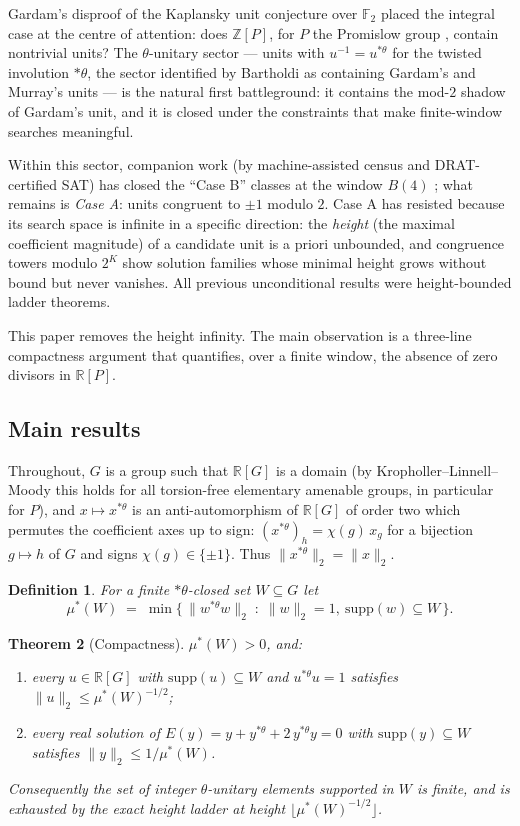 \documentclass[11pt]{article}
\newtheorem{theorem}{Theorem}[section]
\newtheorem{definition}[theorem]{Definition}
\newcommand{\ZZ}{\mathbb{Z}}
\newcommand{\RR}{\mathbb{R}}
\newcommand{\thst}{{*\theta}}
\newcommand{\supp}{\mathrm{supp}}
\begin{document}
Gardam's disproof of the Kaplansky unit conjecture over $\mathbb{F}_2$
\cite{Gardam} placed the integral case at the centre of attention:
does $\ZZ[P]$, for $P$ the Promislow group \cite{Promislow1988},
contain nontrivial units?  The $\theta$-unitary sector --- units with
$u^{-1}=u^{\thst}$ for the twisted involution $\thst$, the sector
identified by Bartholdi \cite{Bartholdi2022} as containing Gardam's
and Murray's units --- is the natural first battleground: it contains
the mod-$2$ shadow of Gardam's unit, and it is closed under the
constraints that make finite-window searches meaningful.

Within this sector, companion work (by machine-assisted census and
DRAT-certified SAT) has closed the ``Case B'' classes at the window
$B(4)$ \cite{paper4,paper6}; what remains is \emph{Case A}: units
congruent to $\pm 1$ modulo $2$.  Case A has resisted because its search space is infinite
in a specific direction: the \emph{height} (the maximal coefficient
magnitude) of a candidate unit is a priori unbounded, and congruence
towers modulo $2^K$ show solution families whose minimal height grows
without bound but never vanishes.  All previous unconditional results
were height-bounded ladder theorems.

This paper removes the height infinity.  The main observation is a
three-line compactness argument that quantifies, over a finite window,
the absence of zero divisors in $\RR[P]$.

\subsection*{Main results}

Throughout, $G$ is a group such that $\RR[G]$ is a domain (by
Kropholler--Linnell--Moody \cite{KLM} this holds for all torsion-free
elementary amenable groups, in particular for $P$), and
$x\mapsto x^{\thst}$ is an anti-automorphism of $\RR[G]$ of order two
which permutes the coefficient axes up to sign: $(x^{\thst})_h =
\chi(g)\,x_g$ for a bijection $g\mapsto h$ of $G$ and signs
$\chi(g)\in\{\pm1\}$.  Thus $\|x^{\thst}\|_2=\|x\|_2$.

\begin{definition}
For a finite $\thst$-closed set $W\subseteq G$ let
\[
\mu^*(W)\;=\;\min\bigl\{\,\|w^{\thst}w\|_2\;:\;\|w\|_2=1,\
\supp(w)\subseteq W\,\bigr\}.
\]
\end{definition}

\begin{theorem}[Compactness]\label{thm:compact}
$\mu^*(W)>0$, and:
\begin{enumerate}
\item[(a)] every $u\in\RR[G]$ with $\supp(u)\subseteq W$ and
$u^{\thst}u=1$ satisfies $\|u\|_2\le \mu^*(W)^{-1/2}$;
\item[(b)] every real solution of
$E(y)=y+y^{\thst}+2\,y^{\thst}y=0$ with $\supp(y)\subseteq W$
satisfies $\|y\|_2\le 1/\mu^*(W)$.
\end{enumerate}
Consequently the set of \emph{integer} $\theta$-unitary elements
supported in $W$ is finite, and is exhausted by the exact height
ladder at height $\lfloor\mu^*(W)^{-1/2}\rfloor$.
\end{theorem}
\end{document}
